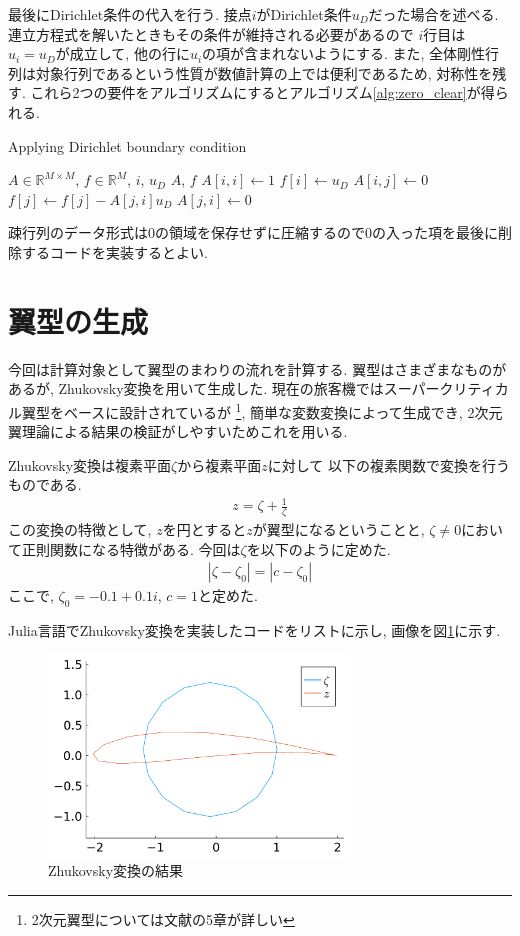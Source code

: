 \documentclass{ltjsarticle}
\begin{document}
最後にDirichlet条件の代入を行う.
接点$i$がDirichlet条件$u_D$だった場合を述べる.
連立方程式を解いたときもその条件が維持される必要があるので
$i$行目は$u_i=u_D$が成立して, 他の行に$u_i$の項が含まれないようにする.
また, 全体剛性行列は対象行列であるという性質が数値計算の上では便利であるため,
対称性を残す.
これら2つの要件をアルゴリズムにするとアルゴリズム\ref{alg:zero_clear}が得られる.
\begin{algorithm}
    \caption{Applying Dirichlet boundary condition}
    \label{alg:zero_clear}
    \begin{algorithmic}
        \Require $A \in\mathbb{R}^{M\times M}$, $f \in\mathbb{R}^{M}$, $i$, $u_D$
        \Ensure $A$, $f$
        \State $A[i,i] \leftarrow 1$
        \State $f[i] \leftarrow u_D$
            \State $A[i, j] \leftarrow 0$ 
            \State $f[j] \leftarrow  f[j] - A[j,i]u_D $
            \State $A[j,i] \leftarrow 0$
        \EndFor
    \end{algorithmic}
\end{algorithm}
疎行列のデータ形式は0の領域を保存せずに圧縮するので0の入った項を最後に削除するコードを実装するとよい.

\section{翼型の生成}
今回は計算対象として翼型のまわりの流れを計算する. 
翼型はさまざまなものがあるが, Zhukovsky変換を用いて生成した. 
現在の旅客機ではスーパークリティカル翼型をベースに設計されているが
\cite{Rinoie2011}\footnote{2次元翼型については文献\cite{Rinoie2011}の5章が詳しい},
簡単な変数変換によって生成でき, 
2次元翼理論による結果の検証がしやすいためこれを用いる.

Zhukovsky変換は複素平面$\zeta$から複素平面$z$に対して
以下の複素関数で変換を行うものである.
\begin{align}
    z = \zeta +\frac{1}{\zeta}
\end{align}
この変換の特徴として, $z$を円とすると$z$が翼型になるということと,
$\zeta\neq 0$において正則関数になる特徴がある.
今回は$\zeta$を以下のように定めた.
\begin{align}
    |\zeta- \zeta_0| = |c-\zeta_0|
\end{align}
ここで, $\zeta_0 = -0.1+0.1i$, $c=1$と定めた.

Julia言語でZhukovsky変換を実装したコードをリストに示し, 
画像を図\ref{fig:zhukovsky}に示す.
\begin{figure}[htbp]
    \centering
    \includegraphics[width=8cm]{ZhukovskyWing.pdf}
    \caption{Zhukovsky変換の結果}
    \label{fig:zhukovsky}
\end{figure}
\end{document}
